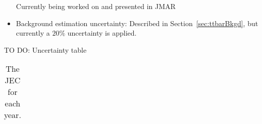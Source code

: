 \begin{itemize}
{\color{red} Currently being worked on and presented in JMAR} 

  \item {Background estimation uncertainty}:
Described in Section~\ref{sec:ttbarBkgd}, but currently a {\color{red} $20\%$} uncertainty is applied.

\end{itemize}


{\color{red} TO DO: Uncertainty table}

\begin{table}[htbp]
  \caption{
    The JEC for each year.
  }
  \centering
  \label{tab:systematics}
  \begin{tabular}{ c l l }
\hline
\hline
  \end{tabular}
\end{table}

